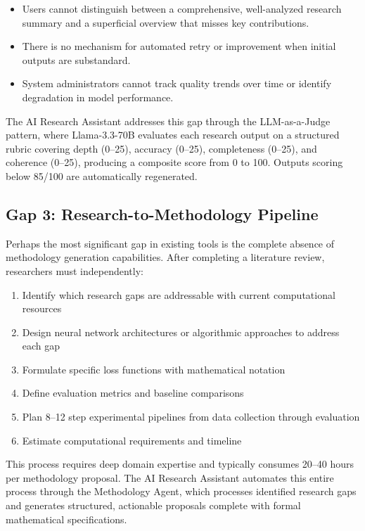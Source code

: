\documentclass[a4paper,12pt,openany]{report}
\begin{document}
\begin{itemize}[leftmargin=2cm]
\item Users cannot distinguish between a comprehensive, well-analyzed research summary and a superficial overview that misses key contributions.
\item There is no mechanism for automated retry or improvement when initial outputs are substandard.
\item System administrators cannot track quality trends over time or identify degradation in model performance.
\end{itemize}

The AI Research Assistant addresses this gap through the LLM-as-a-Judge pattern, where Llama-3.3-70B evaluates each research output on a structured rubric covering depth (0--25), accuracy (0--25), completeness (0--25), and coherence (0--25), producing a composite score from 0 to 100. Outputs scoring below 85/100 are automatically regenerated.

\subsection{Gap 3: Research-to-Methodology Pipeline}

Perhaps the most significant gap in existing tools is the complete absence of methodology generation capabilities. After completing a literature review, researchers must independently:

\begin{enumerate}[label=(\alph*), leftmargin=2cm]
\item Identify which research gaps are addressable with current computational resources
\item Design neural network architectures or algorithmic approaches to address each gap
\item Formulate specific loss functions with mathematical notation
\item Define evaluation metrics and baseline comparisons
\item Plan 8--12 step experimental pipelines from data collection through evaluation
\item Estimate computational requirements and timeline
\end{enumerate}

This process requires deep domain expertise and typically consumes 20--40 hours per methodology proposal. The AI Research Assistant automates this entire process through the Methodology Agent, which processes identified research gaps and generates structured, actionable proposals complete with formal mathematical specifications.
\end{document}
